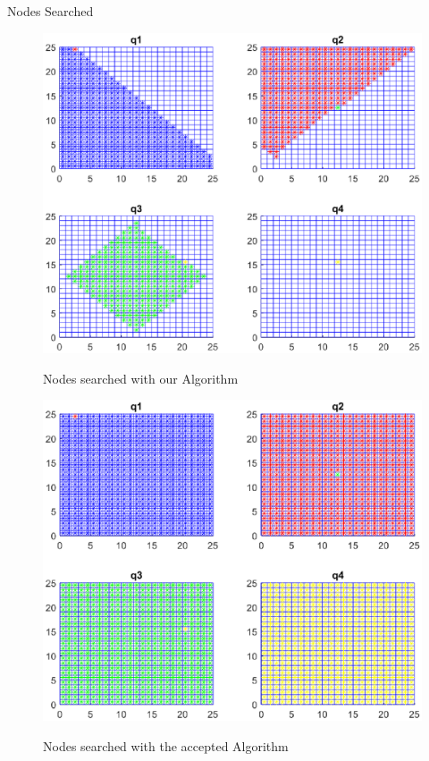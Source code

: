 \documentclass{beamer}
\begin{document}
\begin{frame}{Nodes Searched}
\begin{figure}[!htb]
\centering
\includegraphics[scale=0.17]{../writing/ourPlot}
\label{fig:animOur}
\caption{Nodes searched with our Algorithm}
\end{figure}

\begin{figure}[!htb]
\centering
\includegraphics[scale=0.17]{../writing/acceptedPlot}
\label{fig:animAccept}
\caption{Nodes searched with the accepted Algorithm}
\end{figure}
\end{frame}
\end{document}
